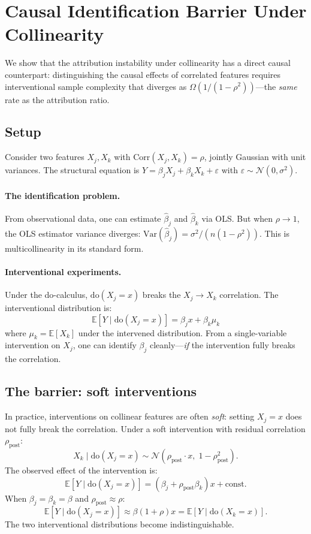 \documentclass{article}
\newcommand{\Var}{\mathrm{Var}}
\begin{document}
\section{Causal Identification Barrier Under Collinearity}
\label{sec:causal-barrier}

We show that the attribution instability under collinearity has a
direct causal counterpart: distinguishing the causal effects of
correlated features requires interventional sample complexity that
diverges as $\Omega(1/(1-\rho^2))$---the \emph{same} rate as the
attribution ratio.

\subsection{Setup}

Consider two features $X_j, X_k$ with $\text{Corr}(X_j, X_k) = \rho$,
jointly Gaussian with unit variances. The structural equation is
$Y = \beta_j X_j + \beta_k X_k + \varepsilon$ with
$\varepsilon \sim \mathcal{N}(0, \sigma^2)$.

\paragraph{The identification problem.}
From observational data, one can estimate $\hat\beta_j$ and
$\hat\beta_k$ via OLS. But when $\rho \to 1$, the OLS estimator
variance diverges: $\Var(\hat\beta_j) = \sigma^2 / (n(1-\rho^2))$.
This is multicollinearity in its standard form.

\paragraph{Interventional experiments.}
Under the do-calculus, $\text{do}(X_j = x)$ breaks the
$X_j \to X_k$ correlation. The interventional distribution is:
\[
    \mathbb{E}[Y \mid \text{do}(X_j = x)] = \beta_j x + \beta_k \mu_k
\]
where $\mu_k = \mathbb{E}[X_k]$ under the intervened distribution.
From a single-variable intervention on $X_j$, one can identify
$\beta_j$ cleanly---\emph{if} the intervention fully breaks the
correlation.

\subsection{The barrier: soft interventions}

In practice, interventions on collinear features are often
\emph{soft}: setting $X_j = x$ does not fully break the correlation.
Under a soft intervention with residual correlation $\rho_{\text{post}}$:
\[
    X_k \mid \text{do}(X_j = x) \sim
    \mathcal{N}(\rho_{\text{post}} \cdot x, \; 1 - \rho_{\text{post}}^2).
\]
The observed effect of the intervention is:
\[
    \mathbb{E}[Y \mid \text{do}(X_j = x)] = (\beta_j + \rho_{\text{post}} \beta_k) x
    + \text{const.}
\]
When $\beta_j = \beta_k = \beta$ and $\rho_{\text{post}} \approx \rho$:
\[
    \mathbb{E}[Y \mid \text{do}(X_j = x)] \approx \beta(1 + \rho) x
    = \mathbb{E}[Y \mid \text{do}(X_k = x)].
\]
The two interventional distributions become indistinguishable.
\end{document}
